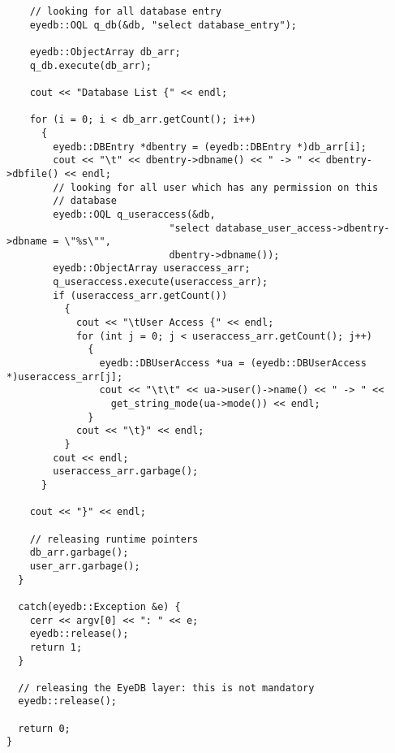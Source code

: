 \begin{verbatim}
    // looking for all database entry
    eyedb::OQL q_db(&db, "select database_entry");

    eyedb::ObjectArray db_arr;
    q_db.execute(db_arr);

    cout << "Database List {" << endl;

    for (i = 0; i < db_arr.getCount(); i++)
      {
        eyedb::DBEntry *dbentry = (eyedb::DBEntry *)db_arr[i];
        cout << "\t" << dbentry->dbname() << " -> " << dbentry->dbfile() << endl;
        // looking for all user which has any permission on this
        // database
        eyedb::OQL q_useraccess(&db,
                            "select database_user_access->dbentry->dbname = \"%s\"",
                            dbentry->dbname());
        eyedb::ObjectArray useraccess_arr;
        q_useraccess.execute(useraccess_arr);
        if (useraccess_arr.getCount())
          {
            cout << "\tUser Access {" << endl;
            for (int j = 0; j < useraccess_arr.getCount(); j++)
              {
                eyedb::DBUserAccess *ua = (eyedb::DBUserAccess *)useraccess_arr[j];
                cout << "\t\t" << ua->user()->name() << " -> " <<
                  get_string_mode(ua->mode()) << endl;
              }
            cout << "\t}" << endl;
          }
        cout << endl;
        useraccess_arr.garbage();
      }

    cout << "}" << endl;

    // releasing runtime pointers
    db_arr.garbage();
    user_arr.garbage();
  }

  catch(eyedb::Exception &e) {
    cerr << argv[0] << ": " << e;
    eyedb::release();
    return 1;
  }

  // releasing the EyeDB layer: this is not mandatory
  eyedb::release();

  return 0;
}
\end{verbatim}
\normalsize



